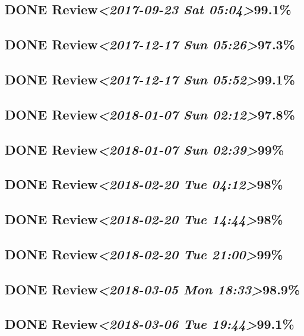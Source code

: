 \documentclass[11pt]{ctexart}
\begin{document}
\subsection{{\bfseries\sffamily DONE} Review\textit{<2017-09-23 Sat 05:04>}99.1\%}
\label{sec:org094b293}

\subsection{{\bfseries\sffamily DONE} Review\textit{<2017-12-17 Sun 05:26>}97.3\%}
\label{sec:orgb21bdc9}
\subsection{{\bfseries\sffamily DONE} Review\textit{<2017-12-17 Sun 05:52>}99.1\%}
\label{sec:orgc255cd7}
\subsection{{\bfseries\sffamily DONE} Review\textit{<2018-01-07 Sun 02:12>}97.8\%}
\label{sec:orgf538b11}
\subsection{{\bfseries\sffamily DONE} Review\textit{<2018-01-07 Sun 02:39>}99\%}
\label{sec:orgd563f38}
\subsection{{\bfseries\sffamily DONE} Review\textit{<2018-02-20 Tue 04:12>}98\%}
\label{sec:org8708e9e}
\subsection{{\bfseries\sffamily DONE} Review\textit{<2018-02-20 Tue 14:44>}98\%}
\label{sec:org76ce354}
\subsection{{\bfseries\sffamily DONE} Review\textit{<2018-02-20 Tue 21:00>}99\%}
\label{sec:orgd55b89c}
\subsection{{\bfseries\sffamily DONE} Review\textit{<2018-03-05 Mon 18:33>}98.9\%}
\label{sec:org2b86e60}
\subsection{{\bfseries\sffamily DONE} Review\textit{<2018-03-06 Tue 19:44>}99.1\%}
\label{sec:orgdb54e52}
\end{document}
